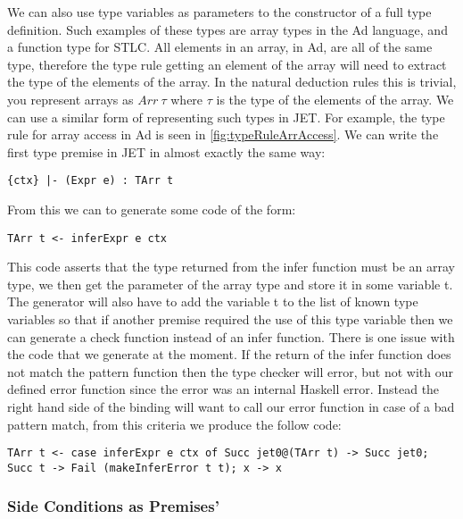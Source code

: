 We can also use type variables as parameters to the constructor of a full type definition.
Such examples of these types are array types in the Ad language, and a function type for STLC.
All elements in an array, in Ad, are all of the same type, therefore the type rule getting an element of the array will need to extract the type of the elements of the array.
In the natural deduction rules this is trivial, you represent arrays as $Arr~\tau$ where $\tau$ is the type of the elements of the array.
We can use a similar form of representing such types in JET.
For example, the type rule for array access in Ad is seen in \autoref{fig:typeRuleArrAccess}.
We can write the first type premise in JET in almost exactly the same way:
\begin{lstlisting}[numbers=none]
{ctx} |- (Expr e) : TArr t 
\end{lstlisting}
From this we can to generate some code of the form:
\begin{lstlisting}[numbers=none]
TArr t <- inferExpr e ctx
\end{lstlisting}
This code asserts that the type returned from the infer function must be an array type, we then get the parameter of the array type and store it in some variable t.
The generator will also have to add the variable t to the list of known type variables so that if another premise required the use of this type variable then we can generate a check function instead of an infer function.
There is one issue with the code that we generate at the moment.
If the return of the infer function does not match the pattern function then the type checker will error, but not with our defined error function since the error was an internal Haskell error.
Instead the right hand side of the binding will want to call our error function in case of a bad pattern match, from this criteria we produce the follow code:
\begin{lstlisting}[numbers=none]
TArr t <- case inferExpr e ctx of Succ jet0@(TArr t) -> Succ jet0; Succ t -> Fail (makeInferError t t); x -> x
\end{lstlisting}

\subsubsection{Side Conditions as Premises'}

